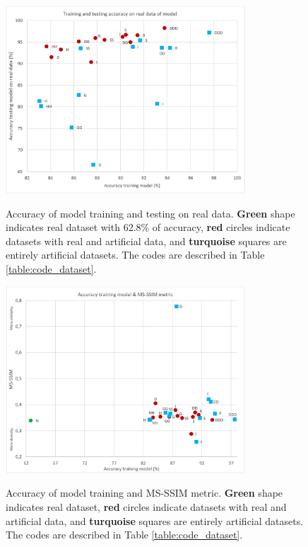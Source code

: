 \documentclass[journal]{IEEEtran}
\begin{document}
\begin{figure}
\centering
{\includegraphics[width=0.8\textwidth,keepaspectratio]{img/entrenamiento_prueba.png}}
\caption{Accuracy of model training and testing on real data. \textcolor{dotgreen}{\textbf{Green}} shape indicates real dataset with 62.8\% of accuracy, \textcolor{dotred}{\textbf{red}} circles indicate datasets with real and artificial data, and \textcolor{dotsky}{\textbf{turquoise}} squares are entirely artificial datasets. The codes are described in Table \ref{table:code_dataset}.}
\label{fig:da_training_test}
\end{figure}

\begin{figure}
\centering
{\includegraphics[width=0.8\textwidth,keepaspectratio]{img/entrenamiento_msssim.png}}
\caption{Accuracy of model training and MS-SSIM metric. \textcolor{dotgreen}{\textbf{Green}} shape indicates real dataset, \textcolor{dotred}{\textbf{red}} circles indicate datasets with real and artificial data, and \textcolor{dotsky}{\textbf{turquoise}} squares are entirely artificial datasets. The codes are described in Table \ref{table:code_dataset}.
}
\label{fig:da_training_msssim}
\end{figure}
\end{document}
